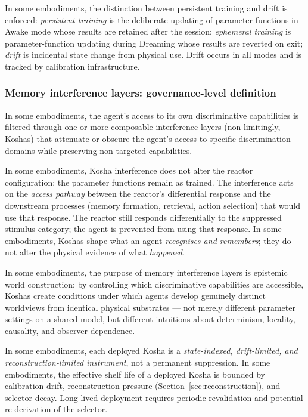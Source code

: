 \documentclass[a4paper,12pt]{article}
\begin{document}
In some embodiments, the distinction between persistent training and
drift is enforced: \emph{persistent training} is the deliberate
updating of parameter functions in Awake mode whose results are
retained after the session; \emph{ephemeral training} is
parameter-function updating during Dreaming whose results are reverted
on exit; \emph{drift} is incidental state change from physical use.
Drift occurs in all modes and is tracked by calibration
infrastructure.


\subsubsection{Memory interference layers: governance-level definition}

In some embodiments, the agent's access to its own discriminative
capabilities is filtered through one or more composable interference
layers (non-limitingly, Koshas) that attenuate or obscure the agent's
access to specific discrimination domains while preserving
non-targeted capabilities.

In some embodiments, Kosha interference does not alter the reactor
configuration: the parameter functions remain as trained. The
interference acts on the \emph{access pathway} between the reactor's
differential response and the downstream processes (memory formation,
retrieval, action selection) that would use that response. The
reactor still responds differentially to the suppressed stimulus
category; the agent is prevented from using that response. In some
embodiments, Koshas shape what an agent \emph{recognises and
remembers}; they do not alter the physical evidence of what
\emph{happened}.

In some embodiments, the purpose of memory interference layers is
epistemic world construction: by controlling which discriminative
capabilities are accessible, Koshas create conditions under which
agents develop genuinely distinct worldviews from identical physical
substrates --- not merely different parameter settings on a shared
model, but different intuitions about determinism, locality,
causality, and observer-dependence.

In some embodiments, each deployed Kosha is a \emph{state-indexed,
drift-limited, and reconstruction-limited instrument}, not a
permanent suppression. In some embodiments, the effective shelf life
of a deployed Kosha is bounded by calibration drift, reconstruction
pressure (Section~\ref{sec:reconstruction}), and selector decay.
Long-lived deployment requires periodic revalidation and potential
re-derivation of the selector.
\end{document}
